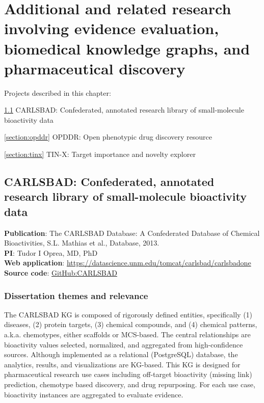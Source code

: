 \chapter{Additional and related research involving evidence evaluation, biomedical knowledge graphs, and pharmaceutical discovery}


\vspace*{\fill}
Projects described in this chapter:


\noindent
\ref{section:carlsbad} CARLSBAD: Confederated, annotated research library of small-molecule bioactivity data

\noindent
\ref{section:opddr} OPDDR: Open phenotypic drug discovery resource

\noindent
\ref{section:tinx} TIN-X: Target importance and novelty explorer

\vspace*{\fill}


\newpage
\section{CARLSBAD: Confederated, annotated research library of 
small-molecule bioactivity data}
\label{section:carlsbad}

\textbf{Publication}: The CARLSBAD Database: A Confederated Database of Chemical Bioactivities, S.L. Mathias et al., Database, 2013\cite{Mathias2013-hj}.\\
\textbf{PI}: Tudor I Oprea, MD, PhD\\
\textbf{Web application}: \href{https://datascience.unm.edu/tomcat/carlsbad/carlsbadone}{https://datascience.unm.edu/tomcat/carlsbad/carlsbadone}\\
\textbf{Source code}: \href{https://github.com/unmtransinfo/CARLSBAD}{GitHub:CARLSBAD}

\subsection{Dissertation themes and relevance}

The CARLSBAD KG is composed of rigorously defined entities, specifically (1) diseases, (2) protein targets, (3) chemical compounds, and (4) chemical patterns, a.k.a. chemotypes, either scaffolds or MCS-based. The central relationships are bioactivity values selected, normalized, and aggregated from high-confidence sources. Although implemented as a relational (PostgreSQL) database, the analytics, results, and visualizations are KG-based. This KG is designed for pharmaceutical research use cases including off-target bioactivity (missing link) prediction, chemotype based discovery, and drug repurposing. For each use case, bioactivity instances are aggregated to evaluate evidence.

